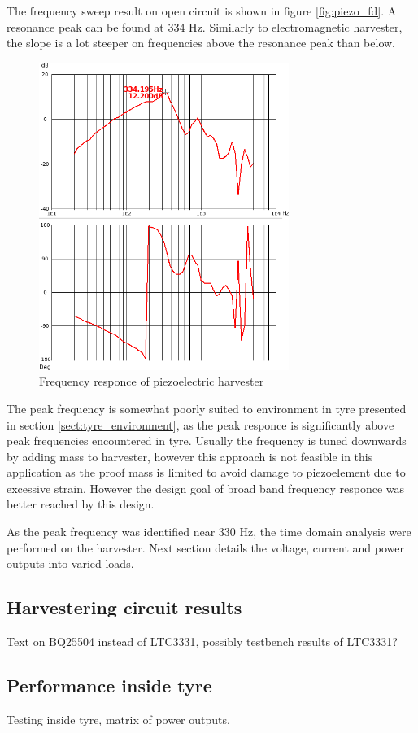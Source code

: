 The frequency sweep result on open circuit is shown in figure \ref{fig:piezo_fd}. A resonance peak can be found at 334 Hz. Similarly to electromagnetic harvester, the slope is a lot steeper on frequencies above the resonance peak than below. 

\begin{figure}[htb]
\begin{center}
\includegraphics[height=10cm]{images/own_measurement/generator_shaker/piezo_fd_open_2_3.png}
\end{center}
\caption{\label{fig:piezo_td_vi} Frequency responce of piezoelectric harvester}
\end{figure}


The peak frequency is somewhat poorly suited to environment in tyre presented in section \ref{sect:tyre_environment}, as the peak responce is significantly above peak frequencies encountered in tyre. Usually the frequency is tuned downwards by adding mass to harvester, however this approach is not feasible in this application as the proof mass is limited to avoid damage to piezoelement due to excessive strain. However the design goal of broad band frequency responce was better reached by this design.

As the peak frequency was identified near 330 Hz, the time domain analysis were performed on the harvester. Next section details the voltage, current and power outputs into varied loads.

\subsection{Harvestering circuit results }
Text on BQ25504 instead of LTC3331, possibly testbench results of LTC3331?

\subsection{Performance inside tyre}
Testing inside tyre, matrix of power outputs. 

